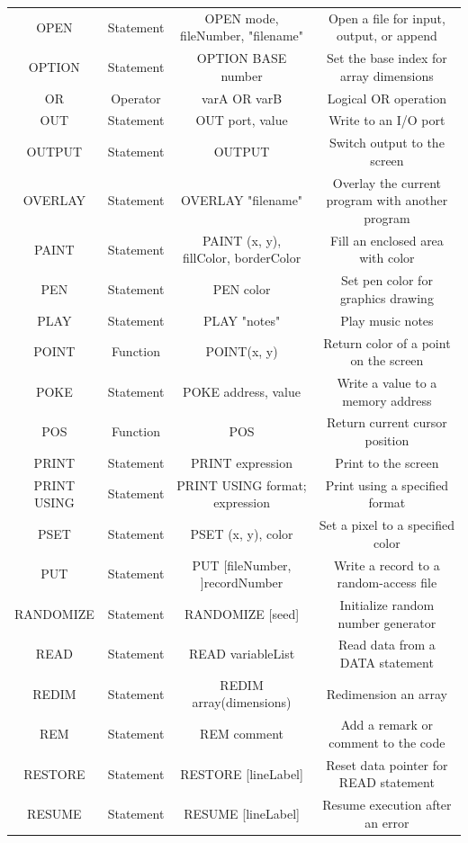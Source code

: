 \documentclass[10pt, reqno]{exam}
\begin{document}
{\begin{longtable}{|c|c|c|c|}
    OPEN & Statement & OPEN mode, fileNumber, "filename" & Open a file for input, output, or append \\
    OPTION & Statement & OPTION BASE number & Set the base index for array dimensions \\
    OR & Operator & varA OR varB & Logical OR operation \\
    OUT & Statement & OUT port, value & Write to an I/O port \\
    OUTPUT & Statement & OUTPUT & Switch output to the screen \\
    OVERLAY & Statement & OVERLAY "filename" & Overlay the current program with another program \\
    PAINT & Statement & PAINT (x, y), fillColor, borderColor & Fill an enclosed area with color \\
    PEN & Statement & PEN color & Set pen color for graphics drawing \\
    PLAY & Statement & PLAY "notes" & Play music notes \\
    POINT & Function & POINT(x, y) & Return color of a point on the screen \\
    POKE & Statement & POKE address, value & Write a value to a memory address \\
    POS & Function & POS & Return current cursor position \\
    PRINT & Statement & PRINT expression & Print to the screen \\
    PRINT USING & Statement & PRINT USING format; expression & Print using a specified format \\
    PSET & Statement & PSET (x, y), color & Set a pixel to a specified color \\
    PUT & Statement & PUT [fileNumber, ]recordNumber & Write a record to a random-access file \\
    RANDOMIZE & Statement & RANDOMIZE [seed] & Initialize random number generator \\
    READ & Statement & READ variableList & Read data from a DATA statement \\
    REDIM & Statement & REDIM array(dimensions) & Redimension an array \\
    REM & Statement & REM comment & Add a remark or comment to the code \\
    RESTORE & Statement & RESTORE [lineLabel] & Reset data pointer for READ statement \\
    RESUME & Statement & RESUME [lineLabel] & Resume execution after an error \\

\end{longtable}}
\end{document}
